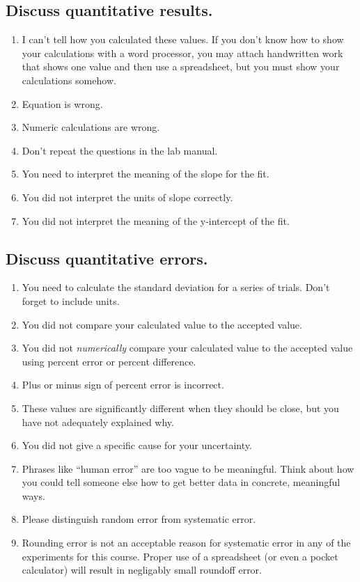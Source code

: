 \documentclass[12pt,letterpaper]{article}
\begin{document}
\begin{multicols}{2}
\subsection*{Discuss quantitative results.}

\begin{enumerate}[start=120]
  \item I can't tell how you calculated these values.
    If you don't know how to show your calculations with a word processor,
    you may attach handwritten work that shows one value
    and then use a spreadsheet,
    but you must show your calculations somehow.
  \item Equation is wrong.
  \item Numeric calculations are wrong.
  \item Don't repeat the questions in the lab manual.
  \item You need to interpret the meaning of the slope for the fit.
  \item You did not interpret the units of slope correctly.
  \item You did not interpret the meaning of the y-intercept of the fit.
\end{enumerate}

\subsection*{Discuss quantitative errors.}

\begin{enumerate}[start=130]
  \item You need to calculate the standard deviation
    for a series of trials. Don't forget to include units.
  \item You did not compare your calculated value to the accepted value.
  \item You did not \emph{numerically} compare your calculated value
    to the accepted value using percent error or percent difference.
  \item Plus or minus sign of percent error is incorrect.
  \item These values are significantly different when they should be close,
    but you have not adequately explained why.
  \item You did not give a specific cause for your uncertainty.
  \item Phrases like ``human error'' are too vague to be meaningful.
    Think about how you could tell someone else how to get better data
    in concrete, meaningful ways.
  \item Please distinguish random error from systematic error.
  \item Rounding error is not an acceptable reason for systematic error
    in any of the experiments for this course.
    Proper use of a spreadsheet (or even a pocket calculator)
    will result in negligably small roundoff error.
\end{enumerate}


\end{multicols}
\end{document}
